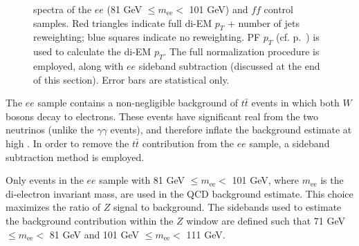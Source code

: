 \documentclass[dissertation.tex]{subfiles}
\begin{document}
\begin{figure}
	\hspace{1cm}
	\caption{\MET spectra of the $ee$ (81 GeV $\leq m_{\mathrm{ee}} <$ 101 GeV) and $\mathit{ff}$ control samples.  Red triangles indicate full di-EM $p_{T}$ + number of jets reweighting; blue squares indicate no reweighting.  PF $p_{T}$ (cf. p.~\pageref{fig:ET_bias_vs_EMF}) is used to calculate the di-EM $p_{T}$.  The full normalization procedure is employed, along with $ee$ sideband subtraction (discussed at the end of this section).  Error bars are statistical only.}
	\label{fig:reweighting_vs_no_reweighting}
\end{figure}

The $ee$ sample contains a non-negligible background of $t\bar{t}$ events in which both $W$ bosons decay to electrons.  These events have significant real \MET from the two neutrinos (unlike the $\gamma\gamma$ events), and therefore inflate the background estimate at high \MET.  In order to remove the $t\bar{t}$ contribution from the $ee$ sample, a sideband subtraction method is employed.

Only events in the $ee$ sample with 81 GeV $\leq m_{\mathrm{ee}} <$ 101 GeV, where $m_{\mathrm{ee}}$ is the di-electron invariant mass, are used in the QCD background estimate.  This choice maximizes the ratio of $Z$ signal to background.  The sidebands used to estimate the background contribution within the $Z$ window are defined such that 71 GeV $\leq m_{\mathrm{ee}} <$ 81 GeV and 101 GeV $\leq m_{\mathrm{ee}} <$ 111 GeV.
\end{document}
